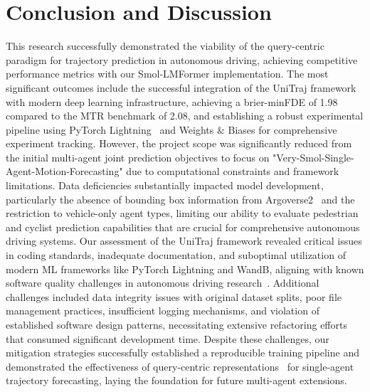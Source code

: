 \section{Conclusion and Discussion}
\label{sec:conclusion}
This research successfully demonstrated the viability of the query-centric paradigm for trajectory prediction in autonomous driving, achieving competitive performance metrics with our Smol-LMFormer implementation. The most significant outcomes include the successful integration of the UniTraj framework~\cite{unitrajFeng2024} with modern deep learning infrastructure, achieving a brier-minFDE of 1.98 compared to the MTR benchmark of 2.08, and establishing a robust experimental pipeline using PyTorch Lightning~\cite{falcon2019pytorch} and Weights \& Biases for comprehensive experiment tracking. However, the project scope was significantly reduced from the initial multi-agent joint prediction objectives to focus on "Very-Smol-Single-Agent-Motion-Forecasting" due to computational constraints and framework limitations. Data deficiencies substantially impacted model development, particularly the absence of bounding box information from Argoverse2~\cite{av2Wilson2023} and the restriction to vehicle-only agent types, limiting our ability to evaluate pedestrian and cyclist prediction capabilities that are crucial for comprehensive autonomous driving systems. Our assessment of the UniTraj framework revealed critical issues in coding standards, inadequate documentation, and suboptimal utilization of modern ML frameworks like PyTorch Lightning and WandB, aligning with known software quality challenges in autonomous driving research~\cite{metadriveLi2022}. Additional challenges included data integrity issues with original dataset splits, poor file management practices, insufficient logging mechanisms, and violation of established software design patterns, necessitating extensive refactoring efforts that consumed significant development time. Despite these challenges, our mitigation strategies successfully established a reproducible training pipeline and demonstrated the effectiveness of query-centric representations~\cite{qcnetZhou2023} for single-agent trajectory forecasting, laying the foundation for future multi-agent extensions.

